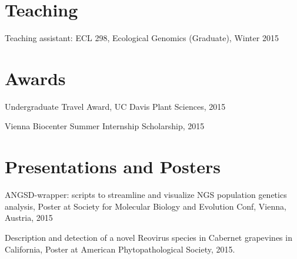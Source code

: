 \documentclass[letterpaper]{article}
\renewenvironment{itemize}{
  \begin{list}{}{
    \setlength{\leftmargin}{1em}
  }
}{
  \end{list}
}
\begin{document}
\section*{Teaching}
\begin{itemize}
\item Teaching assistant: ECL 298, Ecological Genomics (Graduate), Winter 2015
\end{itemize}

\section*{Awards}
\begin{itemize}
\item Undergraduate Travel Award, UC Davis Plant Sciences, 2015
\item Vienna Biocenter Summer Internship Scholarship, 2015
\end{itemize}

\section*{Presentations and Posters}
\begin{itemize}
\item ANGSD-wrapper: scripts to streamline and visualize NGS population genetics analysis, Poster at Society for Molecular Biology and Evolution Conf, Vienna, Austria, 2015
\item Description and detection of a novel Reovirus species in Cabernet grapevines in California, Poster at American Phytopathological Society, 2015.
\end{itemize}

\end{document}
